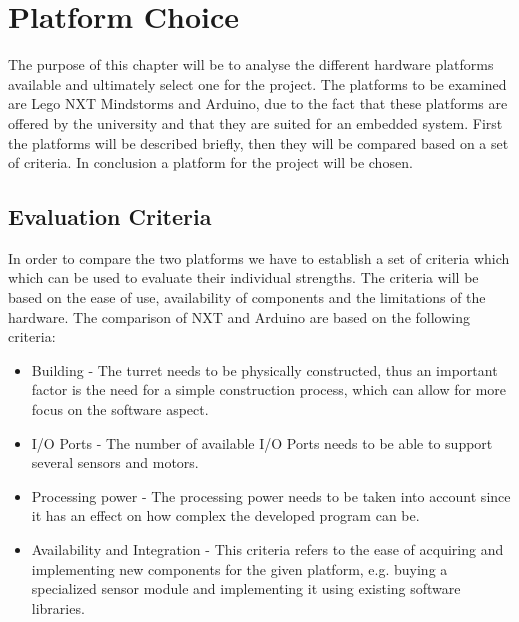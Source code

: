 \chapter{Platform Choice}\label{PlatformC}
The purpose of this chapter will be to analyse the different hardware platforms available
and ultimately select one for the project. The platforms to be examined are Lego
NXT Mindstorms and Arduino, due to the fact that these platforms are offered by
the university and that they are suited for an embedded system.
First the platforms will be described briefly, then they will be
compared based on a set of criteria. In conclusion a platform for the project
will be chosen.

\section{Evaluation Criteria}\label{EvalCrit}
In order to compare the two platforms we have to establish a set of criteria
which which can be used to evaluate their individual strengths. The criteria
will be based on the ease of use, availability of components and the limitations
of the hardware. The comparison of NXT and Arduino are based on the following
criteria:

\begin{itemize}
  \item Building - The turret needs to be physically constructed, thus an
  important factor is the need for a simple construction process, which can
  allow for more focus on the software aspect.
  \item I/O Ports - The number of available I/O Ports needs to be able to
  support several sensors and motors.
  \item Processing power - The processing power needs to be taken into account
  since it has an effect on how complex the developed program can be.
  \item Availability and Integration - This criteria refers to the ease of
  acquiring and implementing new components for the given platform, e.g. buying
  a specialized sensor module and implementing it using existing software
  libraries.
\end{itemize}

